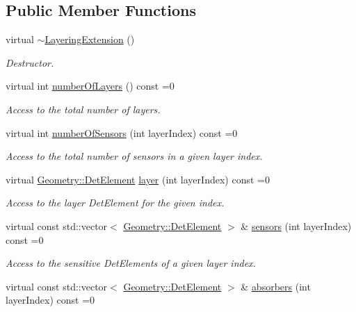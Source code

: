 \subsection*{Public Member Functions}
\begin{DoxyCompactItemize}
\item 
virtual \hyperlink{class_d_d4hep_1_1_d_d_rec_1_1_layering_extension_aab6b9c7fe676917e07c53cffbdd87767}{$\sim$\+Layering\+Extension} ()
\begin{DoxyCompactList}\small\item\em Destructor. \end{DoxyCompactList}\item 
virtual int \hyperlink{class_d_d4hep_1_1_d_d_rec_1_1_layering_extension_a2a0ee0e2bdb875de6573591e2648e446}{number\+Of\+Layers} () const =0
\begin{DoxyCompactList}\small\item\em Access to the total number of layers. \end{DoxyCompactList}\item 
virtual int \hyperlink{class_d_d4hep_1_1_d_d_rec_1_1_layering_extension_a91d00c26112a0456117d1036db335e5d}{number\+Of\+Sensors} (int layer\+Index) const =0
\begin{DoxyCompactList}\small\item\em Access to the total number of sensors in a given layer index. \end{DoxyCompactList}\item 
virtual \hyperlink{class_d_d4hep_1_1_geometry_1_1_det_element}{Geometry\+::\+Det\+Element} \hyperlink{class_d_d4hep_1_1_d_d_rec_1_1_layering_extension_a080be80c3277feaa59828b829d29c747}{layer} (int layer\+Index) const =0
\begin{DoxyCompactList}\small\item\em Access to the layer Det\+Element for the given index. \end{DoxyCompactList}\item 
virtual const std\+::vector$<$ \hyperlink{class_d_d4hep_1_1_geometry_1_1_det_element}{Geometry\+::\+Det\+Element} $>$ \& \hyperlink{class_d_d4hep_1_1_d_d_rec_1_1_layering_extension_a832e6f67c9e507b89f8f41d0a5cc0025}{sensors} (int layer\+Index) const =0
\begin{DoxyCompactList}\small\item\em Access to the sensitive Det\+Elements of a given layer index. \end{DoxyCompactList}\item 
virtual const std\+::vector$<$ \hyperlink{class_d_d4hep_1_1_geometry_1_1_det_element}{Geometry\+::\+Det\+Element} $>$ \& \hyperlink{class_d_d4hep_1_1_d_d_rec_1_1_layering_extension_a1204ac80c52fbca9ce3f71e2b3662eab}{absorbers} (int layer\+Index) const =0

\end{DoxyCompactItemize}
